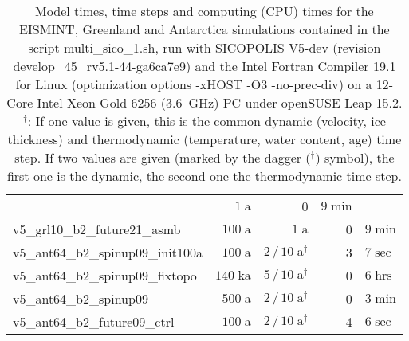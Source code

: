 \documentclass[12pt,a4paper]{article}
\begin{document}
\begin{appendix}
\begin{table}[ht]
\begin{tabular}{lrrr@{.}l}
                                     &    $1\;\mathrm{ a}$\hspace*{1.0em}
                                     &  0&$9\;\mathrm{min}$ \\
v5\_grl10\_b2\_future21\_asmb        &  $100\;\mathrm{ a}$\hspace*{1.47em}
                                     &    $1\;\mathrm{ a}$\hspace*{1.0em}
                                     &  0&$9\;\mathrm{min}$ \\ \hline
v5\_ant64\_b2\_spinup09\_init100a    &  $100\;\mathrm{ a}$\hspace*{1.47em}
                                     & $2\,/\,10\;\mathrm{ a}^{\dagger}$\hspace*{0.6em}
                                     &  3&$7\;\mathrm{sec}$ \\
v5\_ant64\_b2\_spinup09\_fixtopo     &  $140\;\mathrm{ka}$\hspace*{1.0em}
                                     &  $5\,/\,10\;\mathrm{ a}^{\dagger}$\hspace*{0.6em}
                                     &  0&$6\;\mathrm{hrs}$ \\
v5\_ant64\_b2\_spinup09              &  $500\;\mathrm{ a}$\hspace*{1.47em}
                                     & $2\,/\,10\;\mathrm{ a}^{\dagger}$\hspace*{0.6em}
                                     &  0&$3\;\mathrm{min}$ \\
v5\_ant64\_b2\_future09\_ctrl        &  $100\;\mathrm{ a}$\hspace*{1.47em}
                                     & $2\,/\,10\;\mathrm{ a}^{\dagger}$\hspace*{0.6em}
                                     &  4&$6\;\mathrm{sec}$ \\ \hline
\end{tabular}
\caption{Model times, time steps and computing (CPU) times for the EISMINT, Greenland and Antarctica simulations contained in the script multi\_sico\_1.sh, run with SICOPOLIS V5-dev (revision develop\_45\_rv5.1-44-ga6ca7e9) and the Intel Fortran Compiler 19.1 for Linux (optimization options -xHOST -O3 -no-prec-div) on a 12-Core Intel Xeon Gold 6256 (3.6~GHz) PC under openSUSE Leap 15.2.
\protect\\
{}$^\dagger$: If one value is given, this is the common dynamic (velocity, ice thickness) and thermodynamic (temperature, water content, age) time step. If two values are given (marked by the dagger ($^\dagger$) symbol), the first one is the dynamic, the second one the thermodynamic time step.
}
\end{table}
\end{appendix}
\end{document}
